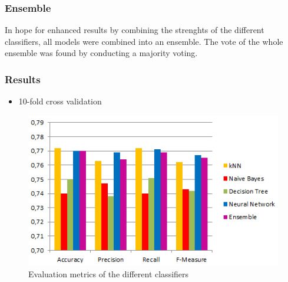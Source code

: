 \begin{frame}
	\frametitle{Ensemble}
	In hope for enhanced results by combining the strenghts of the
	different classifiers, all models were combined into an ensemble. The
	vote of the whole ensemble was found by conducting a majority voting.
\end{frame}


\begin{frame}
	\frametitle{Results}
	\begin{itemize}
		\item 10-fold cross validation
	\end{itemize}
	\begin{figure}[h]
		\centering
		\includegraphics[width=0.8\columnwidth]{../../charts/results.png}
		\caption{Evaluation metrics of the different classifiers}
		\label{fig:result}
	\end{figure}
\end{frame}

\begin{frame}
	\begin{table}[h]
		\centering
		\caption{Confusion matrix of the ensemble}
		\label{tab:mat-vote}
	\end{table}
\end{frame}


